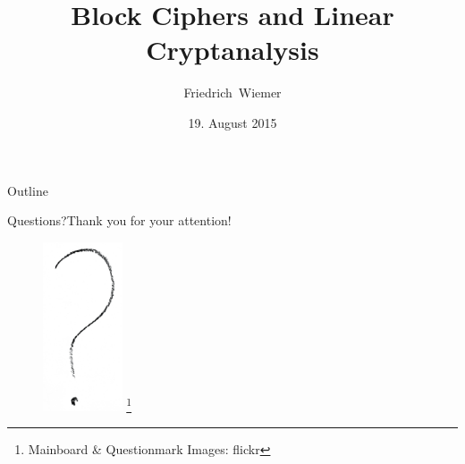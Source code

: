 \documentclass[12pt]{beamer}
\title{Block Ciphers and Linear Cryptanalysis}
\subtitle{}
\author[Friedrich~Wiemer]{Friedrich~Wiemer}
\institute{%
	FluxFingers\\
	Ruhr University Bochum
}
\date{19. August 2015}
\newcommand{\blfootnote}[1]{%
	\begingroup
	\renewcommand\thefootnote{}\footnote{#1}%
	\addtocounter{footnote}{-1}%
	\endgroup
}
\begin{document}
\begin{frame}
	\titlepage{}
\end{frame}

\begin{frame}{Outline}
	\tableofcontents
\end{frame}



\begin{frame}{Questions?}{Thank you for your attention!}
	\begin{figure}[!htb]
		\includegraphics[height=50mm]{data/flickr/questionmark.png}\blfootnote{\scriptsize Mainboard \& Questionmark Images: flickr}
	\end{figure}
\end{frame}
\end{document}
